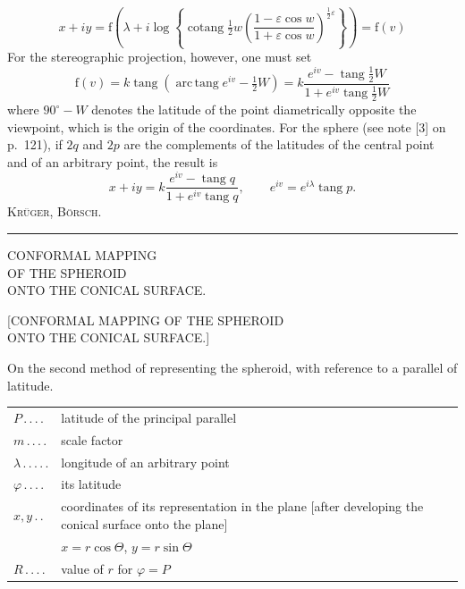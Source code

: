 \[
x+iy=\mathrm f\left(\lambda+i\log\left\{\operatorname{cotang}\tfrac12w\left(\frac{1-\varepsilon\cos w}{1+\varepsilon\cos w}\right)^{\frac12\varepsilon}\right\}\right)=\mathrm f(v)
\]
For the stereographic projection, however, one must set
\[
\mathrm f(v)=k\operatorname{tang}(\operatorname{arc\,tang}e^{iv}-\tfrac12W)=k\frac{e^{iv}-\operatorname{tang}\tfrac12W}{1+e^{iv}\operatorname{tang}\tfrac12W}
\]
where $90^\circ-W$ denotes the latitude of the point diametrically opposite the viewpoint, which is the origin of the coordinates. For the sphere (see note [3] on p.~121), if $2q$ and $2p$ are the complements of the latitudes of the central point and of an arbitrary point, the result is
\[
x+iy=k\frac{e^{iv}-\operatorname{tang}q}{1+e^{iv}\operatorname{tang}q},\qquad e^{iv}=e^{i\lambda}\operatorname{tang}p.
\]
\hfill\textsc{Krüger, Börsch.}\par
\begin{center}\rule{.24\textwidth}{.4pt}\end{center}
\par\endgroup
\clearpage
\null\vfill
\begin{center}
{\LARGE CONFORMAL MAPPING\\[8pt]OF THE SPHEROID\\[8pt]ONTO THE CONICAL SURFACE.}
\end{center}
\vfill\null
\clearpage
\null
\clearpage
\begin{center}
{\LARGE{}}\par\vspace{13mm}
{\large [CONFORMAL MAPPING OF THE SPHEROID\\ONTO THE CONICAL SURFACE.]}
\end{center}
On the second method of representing the spheroid, with reference to a parallel of latitude.
\begin{center}
\begin{tabular}{@{}l@{ }p{}@{}}
$P\, .\, .\, .\, .$&latitude of the principal parallel\\[3pt]
$m\, .\, .\, .\, .$&scale factor\\[3pt]
$\lambda\, .\, .\, .\, .\, .$&longitude of an arbitrary point\\[3pt]
$\varphi\, .\, .\, .\, .$&its latitude\\[3pt]
$x,y\, .\, .$&coordinates of its representation in the plane [after developing the conical surface onto the plane]\\
&\hspace{3em}$x=r\cos\Theta$, $y=r\sin\Theta$\\[3pt]
$R\, .\, .\, .\, .$&value of $r$ for $\varphi=P$
\end{tabular}
\end{center}
